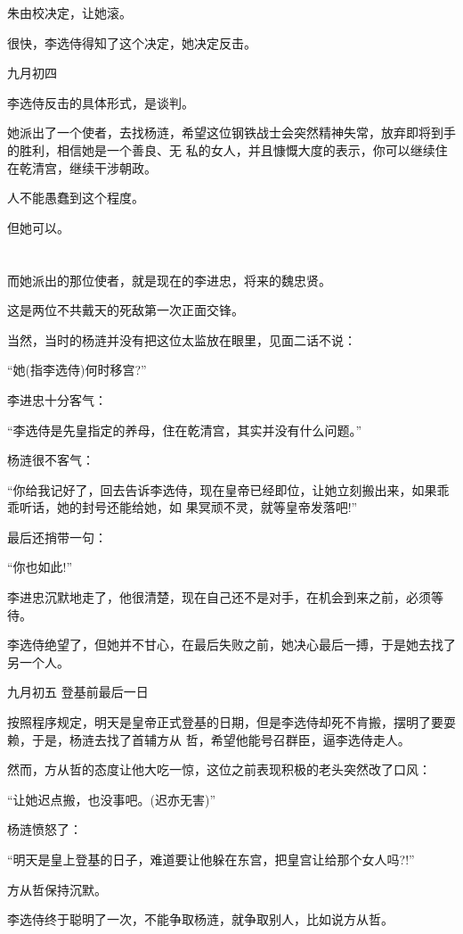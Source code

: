 \documentclass[11pt,a4paper,onecolumn]{article}
\begin{document}
朱由校决定，让她滚。

很快，李选侍得知了这个决定，她决定反击。

九月初四

李选侍反击的具体形式，是谈判。

她派出了一个使者，去找杨涟，希望这位钢铁战士会突然精神失常，放弃即将到手的胜利，相信她是一个善良、无
私的女人，并且慷慨大度的表示，你可以继续住在乾清宫，继续干涉朝政。

人不能愚蠢到这个程度。

但她可以。

\section[\thesection]{}

而她派出的那位使者，就是现在的李进忠，将来的魏忠贤。

这是两位不共戴天的死敌第一次正面交锋。

当然，当时的杨涟并没有把这位太监放在眼里，见面二话不说：

``她(指李选侍)何时移宫?''

李进忠十分客气：

``李选侍是先皇指定的养母，住在乾清宫，其实并没有什么问题。''

杨涟很不客气：

``你给我记好了，回去告诉李选侍，现在皇帝已经即位，让她立刻搬出来，如果乖乖听话，她的封号还能给她，如
果冥顽不灵，就等皇帝发落吧!''

最后还捎带一句：

``你也如此!''

李进忠沉默地走了，他很清楚，现在自己还不是对手，在机会到来之前，必须等待。

李选侍绝望了，但她并不甘心，在最后失败之前，她决心最后一搏，于是她去找了另一个人。

九月初五 登基前最后一日

按照程序规定，明天是皇帝正式登基的日期，但是李选侍却死不肯搬，摆明了要耍赖，于是，杨涟去找了首辅方从
哲，希望他能号召群臣，逼李选侍走人。

然而，方从哲的态度让他大吃一惊，这位之前表现积极的老头突然改了口风：

``让她迟点搬，也没事吧。(迟亦无害)''

杨涟愤怒了：

``明天是皇上登基的日子，难道要让他躲在东宫，把皇宫让给那个女人吗?!''

方从哲保持沉默。

李选侍终于聪明了一次，不能争取杨涟，就争取别人，比如说方从哲。
\end{document}
